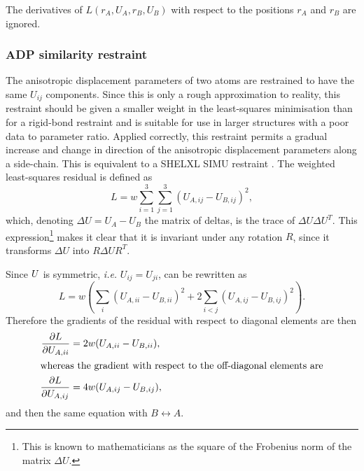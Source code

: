 \documentclass[pdf]{iucr}
\begin{document}
The derivatives of $L(r_A, U_A, r_B, U_B)$ with respect to the positions $r_A$ and $r_B$ are ignored.

\subsubsection{ADP similarity restraint}
\label{ADP:similarity}
The anisotropic displacement parameters of two atoms are restrained to have the same $U_{ij}$ components. Since this is only a rough approximation to reality, this restraint should be given a smaller weight in the least-squares minimisation than for a rigid-bond restraint and is suitable for use in larger structures with a poor data to parameter ratio. Applied correctly, this restraint permits a gradual increase and change in direction of the anisotropic displacement parameters along a side-chain. This is equivalent to a SHELXL SIMU restraint \cite{Sheldrick:1997aa}.
The weighted least-squares residual is defined as
\begin{equation}
\label{eqn:ADP:restraints:similarity}
L = w \sum_{i=1}^3 \sum_{j=1}^3 (U_{A,ij} - U_{B,ij})^2,
\end{equation}
which, denoting $\Delta U=U_A - U_B$ the matrix of deltas, is the trace of $\Delta U \Delta U^T$. This expression\footnote{This is known to mathematicians as the square of the Frobenius norm of the matrix $\Delta U$.} makes it clear that it is invariant under any rotation $R$, since it transforms $\Delta U$ into $R\Delta U R^T$. 

Since $U$ is symmetric, \emph{i.e.} $U_{ij} = U_{ji}$,  can be rewritten as
\begin{equation}
L = w \left( \sum_i (U_{A,ii} - U_{B,ii})^2 + 2 \sum_{i < j} (U_{A,ij} - U_{B,ij})^2 \right) .
\end{equation}
Therefore the gradients of the residual with respect to diagonal elements are then
\begin{align}
\frac{\partial L}{\partial U_{A,ii}} &= 2w(U_{A,ii} - U_{B,ii}),\\
\intertext{whereas the gradient with respect to the off-diagonal elements are}
\frac{\partial L}{\partial U_{A,ij}} &=  4w(U_{A,ij} - U_{B,ij}),
\end{align}
and then the same equation with $B \leftrightarrow A$.
\end{document}

